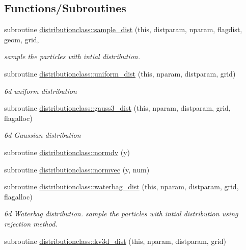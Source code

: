 \subsection*{Functions/\+Subroutines}
\begin{DoxyCompactItemize}
\item 
subroutine \mbox{\hyperlink{namespacedistributionclass_aee8dd99a29887ed3860bcce7adb87ce8}{distributionclass\+::sample\+\_\+dist}} (this, distparam, nparam, flagdist, geom, grid,
\begin{DoxyCompactList}\small\item\em sample the particles with intial distribution. \end{DoxyCompactList}\item 
subroutine \mbox{\hyperlink{namespacedistributionclass_a5e52f4e8f1be5bbedde152f2263e74af}{distributionclass\+::uniform\+\_\+dist}} (this, nparam, distparam, grid)
\begin{DoxyCompactList}\small\item\em 6d uniform distribution \end{DoxyCompactList}\item 
subroutine \mbox{\hyperlink{namespacedistributionclass_af85f956a3fdb677022a546bc69ecfb3c}{distributionclass\+::gauss3\+\_\+dist}} (this, nparam, distparam, grid, flagalloc)
\begin{DoxyCompactList}\small\item\em 6d Gaussian distribution \end{DoxyCompactList}\item 
subroutine \mbox{\hyperlink{namespacedistributionclass_a00377c8aa90fa9dc8b222d71d019f936}{distributionclass\+::normdv}} (y)
\item 
subroutine \mbox{\hyperlink{namespacedistributionclass_acfc04ca0c8be3e0f3e73779c5e88693b}{distributionclass\+::normvec}} (y, num)
\item 
subroutine \mbox{\hyperlink{namespacedistributionclass_aed734df6d00f7004cf11847adb42dd1d}{distributionclass\+::waterbag\+\_\+dist}} (this, nparam, distparam, grid, flagalloc)
\begin{DoxyCompactList}\small\item\em 6d Waterbag distribution. sample the particles with intial distribution using rejection method. \end{DoxyCompactList}\item 
subroutine \mbox{\hyperlink{namespacedistributionclass_a2e96d2c85cac39531d37f2ce057c5766}{distributionclass\+::kv3d\+\_\+dist}} (this, nparam, distparam, grid)

\end{DoxyCompactItemize}
